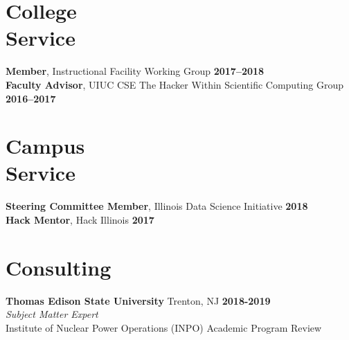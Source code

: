 \documentclass[margin,line]{resume}
\begin{document}
\begin{resume}
    \section{\mysidestyle College\\Service}
                \textbf{Member}, Instructional Facility Working Group \hfill \textbf{2017--2018}\vspace{.5mm}\\%
                \textbf{Faculty Advisor}, UIUC CSE The Hacker Within Scientific Computing Group \hfill \textbf{2016--2017}\vspace{.5mm}\\%
    \section{\mysidestyle Campus\\Service}
                \textbf{Steering Committee Member}, Illinois Data Science Initiative \hfill \textbf{2018}\vspace{.5mm}\\%
                \textbf{Hack Mentor}, Hack Illinois \hfill \textbf{2017}\vspace{.5mm}\\%

    \section{\mysidestyle Consulting}


    \textbf{Thomas Edison State University} Trenton, NJ \hfill
    \textbf{2018-2019}\\
    \textsl{Subject Matter Expert} \\
    Institute of Nuclear Power Operations (INPO) Academic Program Review\\






\end{resume}
\end{document}

